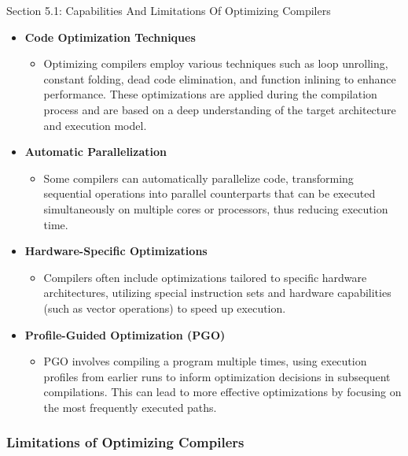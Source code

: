\begin{notes}{Section 5.1: Capabilities And Limitations Of Optimizing Compilers}
    \begin{itemize}
        \item \textbf{Code Optimization Techniques}
        \begin{itemize}
            \item Optimizing compilers employ various techniques such as loop unrolling, constant folding, dead code elimination, and function inlining to enhance performance. These optimizations are 
            applied during the compilation process and are based on a deep understanding of the target architecture and execution model.
        \end{itemize}
        \item \textbf{Automatic Parallelization}
        \begin{itemize}
            \item Some compilers can automatically parallelize code, transforming sequential operations into parallel counterparts that can be executed simultaneously on multiple cores or processors, 
            thus reducing execution time.
        \end{itemize}
        \item \textbf{Hardware-Specific Optimizations}
        \begin{itemize}
            \item Compilers often include optimizations tailored to specific hardware architectures, utilizing special instruction sets and hardware capabilities (such as vector operations) to speed 
            up execution.
        \end{itemize}
        \item \textbf{Profile-Guided Optimization (PGO)}
        \begin{itemize}
            \item PGO involves compiling a program multiple times, using execution profiles from earlier runs to inform optimization decisions in subsequent compilations. This can lead to more effective 
            optimizations by focusing on the most frequently executed paths.
        \end{itemize}
    \end{itemize}
    
    \subsubsection*{Limitations of Optimizing Compilers}
    

\end{notes}
